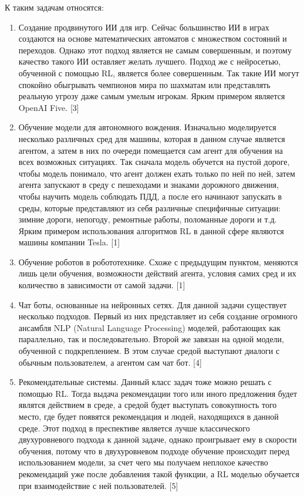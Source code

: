 \documentclass[bachelor, och, referat]{shiza}
\begin{document}
К таким задачам относятся:
\begin{enumerate}
    \item Создание продвинутого ИИ для игр. Сейчас большинство ИИ в играх создаются на основе математических автоматов с множеством состояний
    и переходов. Однако этот подход является не самым совершенным, и поэтому качество такого ИИ оставляет желать лучшего. Подход же с нейросетью,
    обученной с помощью RL, является более совершенным. Так такие ИИ могут спокойно обыгрывать чемпионов мира по шахматам или представлять реальную
    угрозу даже самым умелым игрокам. Ярким примером является OpenAI Five. [3]
    \item Обучение модели для автономного вождения. Изначально моделируется несколько различных сред для машины, которая в данном случае является агентом,
    а затем в них по очереди помещается сам агент для обучения на всех возможных ситуациях. Так сначала модель обучется на пустой дороге, чтобы модель понимало,
    что агент должен ехать только по ней по ней, затем агента запускают в среду с пешеходами и знаками дорожного движения, чтобы научить модель соблюдать ПДД,
    а после его начинают запускать в среды, которые представляют из себя различные специфичные ситуации: зимние дороги, непогоду, ремонтные работы, поломанные
    дороги и т.д. Ярким примером использования алгоритмов RL в данной сфере являются машины компании Tesla. [1]
    \item Обучение роботов в робототехнике. Схоже с предыдущим пунктом, меняются лишь цели обучения, возможности действий агента, условия самих сред и их количество
    в зависимости от самой задачи. [1]
    \item Чат боты, основанные на нейронных сетях. Для данной задачи существует несколько подходов. Первый из них представляет из себя создание огромного ансамбля
    NLP (Natural Language Processing) моделей, работающих как параллельно, так и последовательно. Второй же завязан на одной модели, обученной с подкреплением. В
    этом случае средой выступают диалоги с обычным пользователем, а агентом сам чат бот. [4]
    \item Рекомендательные системы. Данный класс задач тоже можно решать с помощью RL. Тогда выдача рекомендации того или иного предложения будет являтся действием в среде,
    а средой будет выступать совокупность того место, где будет появятся рекомендация и людей, находящихся в данной среде. Этот подход в преспективе является лучше
    классического двухуровневого подхода к данной задаче, однако проигрывает ему в скорости обучения, потому что в двухуровневом подходе обучение происходит
    перед использованием модели, за счет чего мы получаем неплохое качество рекомендаций уже после добавления такой функции, а RL моделью обучается при 
    взаимодействие с ней пользователей. [5]
\end{enumerate}
\end{document}
